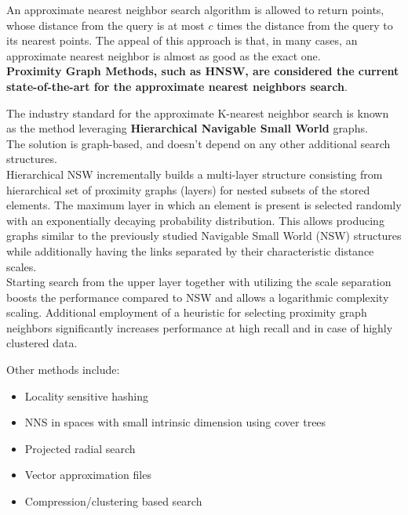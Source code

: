 \documentclass[english, 10pt]{article}
\begin{document}
An approximate nearest neighbor search algorithm is allowed to return points, whose distance from the query is at most $c$ times the distance from the query to its nearest points. The appeal of this approach is that, in many cases, an approximate nearest neighbor is almost as good as the exact one.\\

\textbf{Proximity Graph Methods, such as HNSW, are considered the current state-of-the-art for the approximate nearest neighbors search}.\\

\begin{tcolorbox}[title=Aside: HNSW,colframe=black,colback=white,arc=0pt,fonttitle=\bfseries,breakable]

The industry standard for the approximate K-nearest neighbor search is known as the method leveraging \textbf{Hierarchical Navigable Small World} graphs.\\

The solution is graph-based, and doesn't depend on any other additional search structures.\\

Hierarchical NSW incrementally builds a multi-layer structure consisting from hierarchical set of proximity graphs (layers) for nested subsets of the stored elements. The maximum layer in which an element is present is selected randomly with an exponentially decaying probability distribution. This allows producing graphs similar to the previously studied Navigable Small World (NSW) structures while additionally having the links separated by their characteristic distance scales.\\

Starting search from the upper layer together with utilizing the scale separation boosts the performance compared to NSW and allows a logarithmic complexity scaling. Additional employment of a heuristic for selecting proximity graph neighbors significantly increases performance at high recall and in case of highly clustered data.\\
\end{tcolorbox}

Other methods include:

\begin{itemize}
	\item Locality sensitive hashing
	\item NNS in spaces with small intrinsic dimension using cover trees
	\item Projected radial search
	\item Vector approximation files
	\item Compression/clustering based search
\end{itemize}
\end{document}
